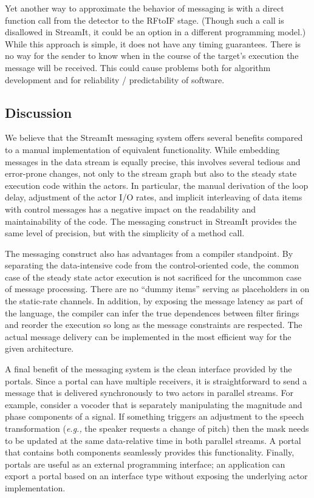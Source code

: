 Yet another way to approximate the behavior of messaging is with a
direct function call from the detector to the RFtoIF stage.  (Though
such a call is disallowed in StreamIt, it could be an option in a
different programming model.)  While this approach is simple, it does
not have any timing guarantees.  There is no way for the sender to
know when in the course of the target's execution the message will be
received.  This could cause problems both for algorithm development
and for reliability / predictability of software.

\subsection{Discussion}

We believe that the StreamIt messaging system offers several benefits
compared to a manual implementation of equivalent functionality.
While embedding messages in the data stream is equally precise, this
involves several tedious and error-prone changes, not only to the
stream graph but also to the steady state execution code within the
actors.  In particular, the manual derivation of the loop delay,
adjustment of the actor I/O rates, and implicit interleaving of data
items with control messages has a negative impact on the readability
and maintainability of the code.  The messaging construct in StreamIt
provides the same level of precision, but with the simplicity of a
method call.

The messaging construct also has advantages from a compiler
standpoint.  By separating the data-intensive code from the
control-oriented code, the common case of the steady state actor
execution is not sacrificed for the uncommon case of message
processing.  There are no ``dummy items'' serving as placeholders in
on the static-rate channels.  In addition, by exposing the message
latency as part of the language, the compiler can infer the true
dependences between filter firings and reorder the execution so long
as the message constraints are respected.  The actual message delivery
can be implemented in the most efficient way for the given
architecture.

A final benefit of the messaging system is the clean interface
provided by the portals.  Since a portal can have multiple receivers,
it is straightforward to send a message that is delivered
synchronously to two actors in parallel streams.  For example,
consider a vocoder that is separately manipulating the magnitude and
phase components of a signal.  If something triggers an adjustment to
the speech transformation ({\it e.g.,} the speaker requests a change
of pitch) then the mask needs to be updated at the same data-relative
time in both parallel streams.  A portal that contains both components
seamlessly provides this functionality.  Finally, portals are useful
as an external programming interface; an application can export a
portal based on an interface type without exposing the underlying
actor implementation.

